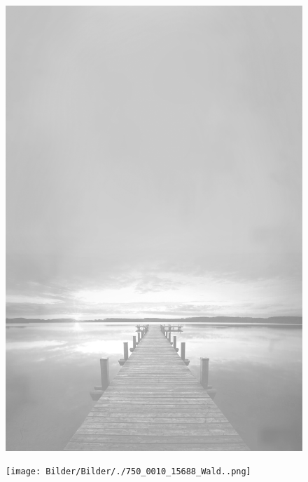\documentclass[ngerman,a4paper,11pt]{scrreprt}
\begin{document}
\begin{figure}[H]
\centering
\includegraphics[width=\textwidth,height=.8\textheight]{Bilder/Bilder/./750_0010_15649__Steg.png}
\end{figure}

\begin{figure}[H]
\centering
\texttt{[image: Bilder/Bilder/./750\_0010\_15688\_Wald..png]}
\end{figure}
\end{document}
